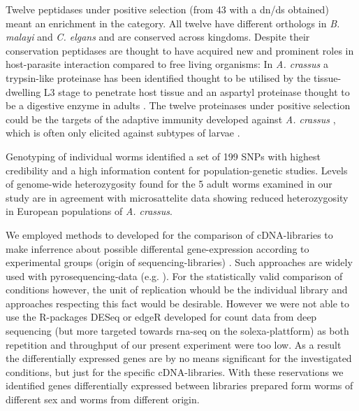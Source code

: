 \documentclass[10pt]{bmc_article}
\newenvironment{bmcformat}{\begin{raggedright}\baselineskip20pt\sloppy\setboolean{publ}{false}}{\end{raggedright}\baselineskip20pt\sloppy}
\begin{document}
\begin{bmcformat}
Twelve peptidases under positive selection (from 43 with a dn/ds
obtained) meant an enrichment in the category. All twelve have
different orthologs in \textit{B. malayi} and \textit{C. elgans} and
are conserved across kingdoms. Despite their conservation peptidases
are thought to have acquired new and prominent roles in host-parasite
interaction compared to free living organisms: In \textit{A. crassus}
a trypsin-like proteinase has been identified thought to be utilised
by the tissue-dwelling L3 stage to penetrate host tissue and an
aspartyl proteinase thought to be a digestive enzyme in adults
\cite{polzer_identification_1993}. The twelve proteinases under
positive selection could be the targets of the adaptive immunity
developed against \textit{A. crassus} \cite{knopf_migratory_2008,
  knopf_vaccination_2008}, which is often only elicited against
subtypes of larvae \cite{molnar_caps}.


Genotyping of individual worms identified a set of 199
SNPs with highest credibility and a high information content for
population-genetic studies. Levels of genome-wide heterozygosity found
for the 5 adult worms examined in our study are in agreement with
microsattelite data \cite{wielgoss_population_2008} showing reduced
heterozygosity in European populations of \textit{A. crassus}.

We employed methods to developed for the comparison of cDNA-libraries
to make inferrence about possible differental gene-expression
according to experimental groups (origin of sequencing-libraries)
\cite{pmid9331369}. Such approaches are widely used with
pyrosequencing-data (e.g. \cite{pmid20470405}). For the statistically
valid comparison of conditions however, the unit of replication whould
be the individual library and approaches respecting this fact would be
desirable. However we were not able to use the R-packages DESeq
\cite{pmid20979621} or edgeR \cite{pmid19910308} developed for count
data from deep sequencing (but more targeted towards rna-seq on the
solexa-plattform) as both repetition and throughput of our present
experiment were too low. As a result the differentially expressed
genes are by no means significant for the investigated conditions, but
just for the specific cDNA-libraries. With these reservations we
identified genes differentially expressed between libraries prepared
form worms of different sex and worms from different origin.


\end{bmcformat}
\end{document}
